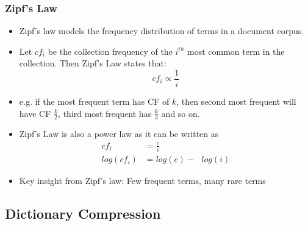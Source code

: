 \documentclass{article}
\begin{document}
\subsubsection{Zipf's Law}
\begin{itemize}
    \item Zipf's law models the frequency distribution of terms in a document corpus. 
    
    \item Let $cf_i$ be the collection frequency of the $i^{th}$ most common term in the collection. Then Zipf's Law states that:
    \begin{equation}
        cf_i \propto \frac{1}{i}
    \end{equation}
    
    \item e.g. if the most frequent term has CF of $k$, then second most frequent will have CF $\frac{k}{2}$, third most frequent has $\frac{k}{3}$ and so on. 
    
    \item Zipf's Law is also a power law as it can be written as
    \begin{align}
                cf_i &= \frac{c}{i} \\
                log(cf_i) &= log(c) -\text{ }log(i)
    \end{align}
    
    \item Key insight from Zipf's law: Few frequent terms, many rare terms

\end{itemize}
    
\subsection{Dictionary Compression}
\end{document}
